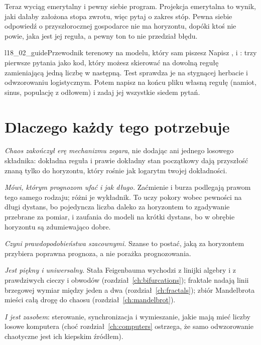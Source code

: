\medskip
\noindent
Teraz wyciąg emerytalny i pewny siebie program. Projekcja emerytalna to
wynik, jaki dałaby założona stopa zwrotu, więc pytaj o zakres stóp. Pewna
siebie odpowiedź o przyszłorocznej gospodarce nie ma horyzontu, dopóki ktoś
nie powie, jaka jest jej reguła, a pewny ton to nie przedział błędu.

\begin{lab}{l18_02_guide}{Przewodnik terenowy na modelu, który sam piszesz}
Napisz ,  i
: trzy pierwsze pytania jako kod, który możesz
skierować na dowolną regułę zamieniającą jedną liczbę w następną. Test
sprawdza je na stygnącej herbacie i odwzorowaniu logistycznym. Potem
napisz na końcu pliku własną regułę (namiot, sinus, populację z odłowem) i
zadaj jej wszystkie siedem pytań.
\end{lab}

\section{Dlaczego każdy tego potrzebuje}
\label{sec:ch18-everyone}

\noindent
\emph{Chaos zakończył erę mechanizmu zegara}, nie dodając ani jednego losowego
składnika: dokładna reguła i prawie dokładny stan początkowy dają przyszłość
znaną tylko do horyzontu, który rośnie jak logarytm twojej dokładności.

\emph{Mówi, którym prognozom ufać i jak długo.} Zaćmienie i burza podlegają
prawom tego samego rodzaju; różni je wykładnik. To uczy pokory wobec
pewności na długi dystans, bo pojedyncza liczba daleko za horyzontem to
zgadywanie przebrane za pomiar, i zaufania do modeli na krótki dystans, bo
w obrębie horyzontu są zdumiewająco dobre.

\emph{Czyni prawdopodobieństwa szacownymi.} Szanse to postać, jaką za
horyzontem przybiera poprawna prognoza, a nie porażka prognozowania.

\emph{Jest piękny i uniwersalny.} Stała Feigenbauma wychodzi z linijki
algebry i z prawdziwych cieczy i obwodów (rozdział~\ref{ch:bifurcations});
fraktale nadają linii brzegowej wymiar między jeden a dwa
(rozdział~\ref{ch:fractals}); zbiór Mandelbrota mieści całą drogę do
chaosu (rozdział~\ref{ch:mandelbrot}).

\emph{I jest zasobem}: sterowanie, synchronizacja i wymieszanie, jakie mają
mieć liczby losowe komputera (choć rozdział~\ref{ch:computers} ostrzega, że
samo odwzorowanie chaotyczne jest ich kiepskim źródłem).

